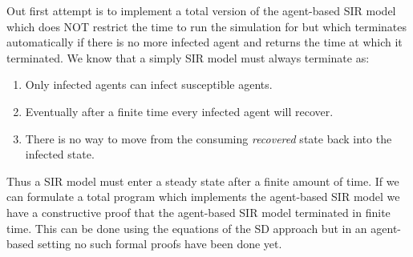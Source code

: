 Out first attempt is to implement a total version of the agent-based SIR model which does NOT restrict the time to run the simulation for but which terminates automatically if there is no more infected agent and returns the time at which it terminated. We know that a simply SIR model must always terminate as:
\begin{enumerate}
	\item Only infected agents can infect susceptible agents.
	\item Eventually after a finite time every infected agent will recover.
	\item There is no way to move from the consuming \textit{recovered} state back into the infected state.
\end{enumerate}
Thus a SIR model must enter a steady state after a finite amount of time. If we can formulate a total program which implements the agent-based SIR model we have a constructive proof that the agent-based SIR model terminated in finite time. This can be done using the equations of the SD approach but in an agent-based setting no such formal proofs have been done yet.
